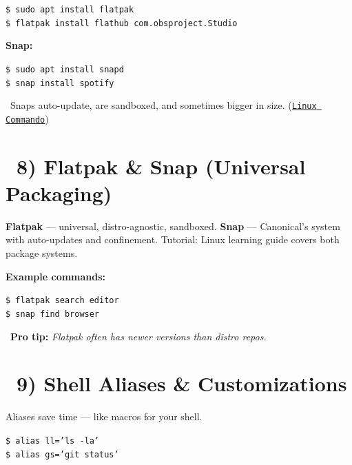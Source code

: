 \documentclass[12pt]{article}
\newcommand{\packageicon}{\faBox}
\newcommand{\shellicon}{\faTerminal}
\begin{document}
\begin{highlightbox}
\texttt{\$ sudo apt install flatpak}\\
\texttt{\$ flatpak install flathub com.obsproject.Studio}
\end{highlightbox}

\textbf{Snap:}

\begin{highlightbox}
\texttt{\$ sudo apt install snapd}\\
\texttt{\$ snap install spotify}
\end{highlightbox}

\begin{infobox}
\faInfoCircle\ Snaps auto-update, are sandboxed, and sometimes bigger in size. (\href{https://linuxcommando.blogspot.com/2018/}{\texttt{Linux Commando}})
\end{infobox}

\section*{\packageicon\ 8) Flatpak \& Snap (Universal Packaging)}

\textbf{Flatpak} — universal, distro-agnostic, sandboxed.
\textbf{Snap} — Canonical's system with auto-updates and confinement.
Tutorial: Linux learning guide covers both package systems.

\textbf{Example commands:}

\begin{highlightbox}
\texttt{\$ flatpak search editor}\\
\texttt{\$ snap find browser}
\end{highlightbox}

\begin{infobox}
\faLightbulb\ \textbf{Pro tip:} \textit{Flatpak often has newer versions than distro repos.}
\end{infobox}

\section*{\shellicon\ 9) Shell Aliases \& Customizations}

Aliases save time — like macros for your shell.

\begin{highlightbox}
\texttt{\$ alias ll='ls -la'}\\
\texttt{\$ alias gs='git status'}
\end{highlightbox}
\end{document}
